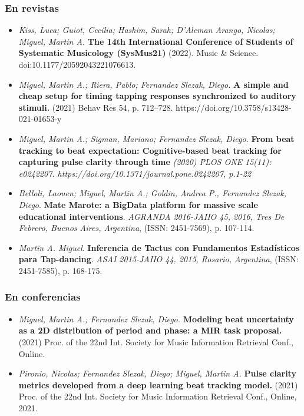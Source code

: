 \documentclass[a4paper,10pt]{article}
\begin{document}
\subsubsection{En revistas}
\begin{itemize}
  \item \emph{Kiss, Luca; Guiot, Cecilia; Hashim, Sarah; D’Aleman Arango,
    Nicolas; Miguel, Martin A.}
    \textbf{The 14th
    International Conference of Students of Systematic Musicology (SysMus21)}
    (2022). Music \& Science. doi:10.1177/20592043221076613.

  \item\emph{Miguel, Martin A.; Riera, Pablo; Fernandez Slezak, Diego.} 
    \textbf{A simple and cheap setup for timing tapping responses synchronized
    to auditory stimuli.} (2021) Behav Res 54, p. 712–728. https://doi.org/10.3758/s13428-021-01653-y

  \item 
    \emph{Miguel, Martin A.; Sigman, Mariano; Fernandez Slezak, Diego.}
    \textbf{From beat tracking to beat expectation: Cognitive-based beat
    tracking for capturing pulse clarity through time} 
    \emph{(2020) PLOS ONE 15(11): e0242207.
        https://doi.org/10.1371/journal.pone.0242207, p.1-22}
    \item 
\emph{Belloli, Laouen; Miguel, Martin A.; Goldin, Andrea P., Fernandez Slezak,
        Diego}.
\textbf{Mate Marote: a BigData platform for massive scale educational
        interventions}.
        \emph{AGRANDA 2016-JAIIO 45, 2016, Tres De Febrero, Buenos Aires,
        Argentina}, (ISSN: 2451-7569), p. 107-114.
    \item 
\emph{Martin A. Miguel}.
\textbf{Inferencia de Tactus con Fundamentos Estadísticos para Tap-dancing}.
        \emph{ASAI 2015-JAIIO 44, 2015, Rosario, Argentina}, (ISSN: 2451-7585),
        p. 168-175.
\end{itemize}

\subsubsection{En conferencias}
\begin{itemize}
 \item\emph{Miguel, Martin A.; Fernandez Slezak, Diego.} 
   \textbf{Modeling beat uncertainty as a 2D distribution of period and
   phase: a MIR task proposal.} (2021) 
   Proc. of the 22nd Int. Society for Music Information Retrieval Conf., Online.

 \item \emph{Pironio, Nicolas; Fernandez Slezak, Diego; Miguel, Martin A.} 
     \textbf{Pulse clarity metrics developed from a deep learning beat tracking
     model.} (2021) Proc. of the 22nd Int. Society for Music Information
Retrieval Conf., Online, 2021.
\end{itemize}
\end{document}
